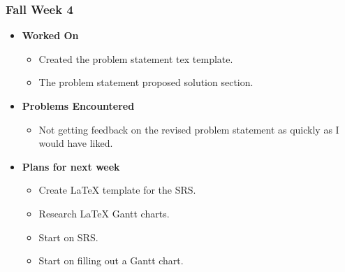 \documentclass[compsoc,draftclsnofoot,onecolumn,10pt]{IEEEtran}
\begin{document}
\subsubsection{Fall Week 4}
\begin{itemize}
    \item {\textbf{Worked On}}
    \begin{itemize}
        \item Created the problem statement tex template.
        \item The problem statement proposed solution section.
    \end{itemize}

    \item {\textbf{Problems Encountered}}
    \begin{itemize}
        \item Not getting feedback on the revised problem statement as quickly as I would have liked.
    \end{itemize}
    \item{\textbf{Plans for next week}}
    \begin{itemize}
        \item Create LaTeX template for the SRS.
        \item Research LaTeX Gantt charts.
        \item Start on SRS.
        \item Start on filling out a Gantt chart.
    \end{itemize}


\end{itemize}
\end{document}
